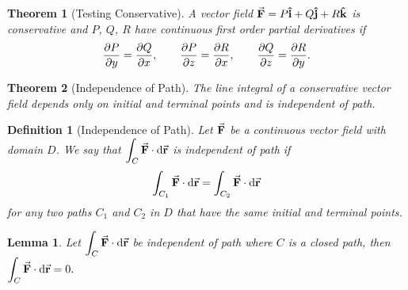 \documentclass[12pt,a4paper]{article}
\newtheorem{thm}{Theorem}[subsection]
\newtheorem{df}{Definition}[subsection]
\newtheorem{lem}{Lemma}[section]
\def\dsst{\displaystyle}
\def\d{{\mathrm{d}}}
\def\intC{\dsst\int_C}
\def\vecr{\va{{\textbf{r}}}}
\def\veci{\vu{\boldsymbol{\textbf{i}}}}
\def\vecj{\vu{\boldsymbol{\textbf{j}}}}
\def\veck{\vu{\boldsymbol{\textbf{k}}}}
\def\F{\va{\boldsymbol{\textbf{F}}}}
\begin{document}
\begin{thm}[Testing Conservative]
	A vector field $\F=P\veci+Q\vecj+R\veck$ is conservative and $P$, $Q$, $R$ have continuous first order partial derivatives if \[\pdv{P}{y}=\pdv{Q}{x},\qquad\pdv{P}{z}=\pdv{R}{x},\qquad\pdv{Q}{z}=\pdv{R}{y}.\]	
\end{thm}
\begin{thm}[Independence of Path]
	The line integral of a conservative vector field depends only on initial and terminal points and is independent of path.	
\end{thm}
\begin{df}[Independence of Path]
	Let $\F$ be a continuous vector field with domain $D$. We say that $\intC\F\cdot\d\vecr$ is independent of path if \[\int_{C_1}\F\cdot\d\vecr=\int_{C_2}\F\cdot\d\vecr\] for any two paths $C_1$ and $C_2$ in $D$ that have the same initial and terminal points. 	
\end{df}
\begin{lem}\label{lem5.1}
	Let $\intC\F\cdot\d\vecr$ be independent of path where $C$ is a closed path, then $\intC\F\cdot\d\vecr=0.$
\end{lem}
\end{document}
